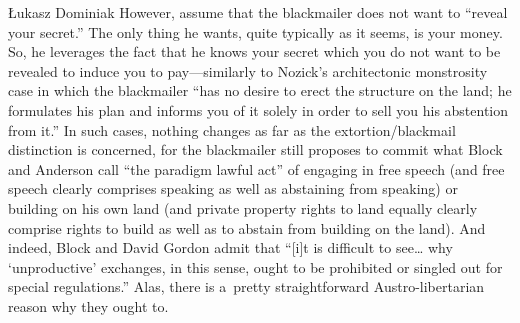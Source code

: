 \begin{artengenv}{Łukasz Dominiak}
However, assume that the blackmailer does not want to ``reveal your secret.'' The only thing he wants, quite typically as it seems, is your money. So, he leverages the fact that he knows your secret which you do not want to be revealed to induce you to pay---similarly to Nozick's 
\parencite*[][pp.84–85]{nozick_anarchy_1974} %
 architectonic monstrosity case in which the blackmailer ``has no desire to erect the structure on the land; he formulates his plan and informs you of it solely in order to sell you his abstention from it.'' In such cases, nothing changes as far as the extortion/blackmail distinction is concerned, for the blackmailer still proposes to commit what Block and Anderson 
\parencite*[][p.546]{block_blackmail_2000} %
 call ``the paradigm lawful act'' of engaging in free speech (and free speech clearly comprises speaking as well as abstaining from speaking) or building on his own land (and private property rights to land equally clearly comprise rights to build as well as to abstain from building on the land). And indeed, Block and David Gordon 
\parencite*[][p.49]{block_blackmail_1985} %
 admit that ``[i]t is difficult to see… why ‘unproductive' exchanges, in this sense, ought to be prohibited or singled out for special regulations.'' Alas, there is a~pretty straightforward Austro-libertarian reason why they ought to.




\end{artengenv}
